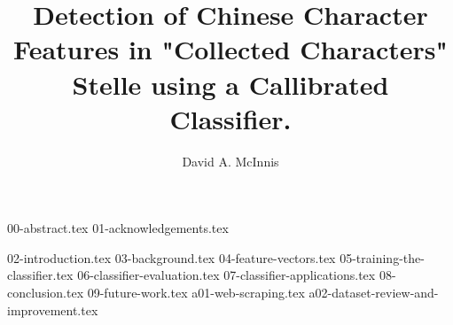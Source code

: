 \documentclass{ewuthesis}
\begin{document}
    \title{Detection of Chinese Character Features in "Collected Characters" Stelle using a Callibrated Classifier.}
    \author{David A. McInnis}    
    
    
    
    
    \frontmatter
    \maketitle
    \makesigpage
    \makelibrarystatement{}
    {00-abstract.tex}
    {01-acknowledgements.tex}
    \mainmatter
    \tableofcontents
    \listoffigures{}
    {02-introduction.tex}
    {03-background.tex}
    {04-feature-vectors.tex}
    {05-training-the-classifier.tex}
    {06-classifier-evaluation.tex}
    {07-classifier-applications.tex}
    {08-conclusion.tex}
    {09-future-work.tex}
    \backmatter{}
    {a01-web-scraping.tex}
    {a02-dataset-review-and-improvement.tex}
    
    



    
    \makevita
    
    
\end{document}
